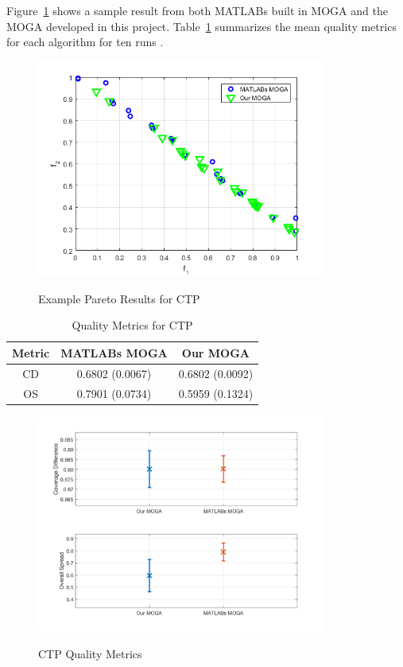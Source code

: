 \documentclass{article}
\begin{document}
\noindent Figure~\ref{fig:CTP} shows a sample result from both MATLABs built in MOGA and the MOGA developed in this project. Table~\ref{tab:CTP} summarizes the mean quality metrics for each algorithm for ten runs \cite{deb2001multi}.
\begin{figure}[H]
  \caption{Example Pareto Results for CTP}
  \centering
  \includegraphics[width=0.85\textwidth]{CTP_pareto_final.png}  
  \label{fig:CTP}
\end{figure}

\begin{table}[H]
\caption{Quality Metrics for CTP} 
\centering 
\begin{tabular}{|c|c|c|} 
\hline  
Metric & MATLABs MOGA & Our MOGA \\ \hline
CD & 0.6802 (0.0067) &  0.6802 (0.0092) \\ \hline
OS & 0.7901 (0.0734) & 0.5959 (0.1324) \\ \hline
\end{tabular}
\label{tab:CTP} 
\end{table} 
\begin{figure}[H]
  \caption{CTP Quality Metrics}
  \centering
  \includegraphics[width=0.85\textwidth]{CTP_QM.png}  
  \label{fig:CTP_QM}
\end{figure}
 
\end{document}
